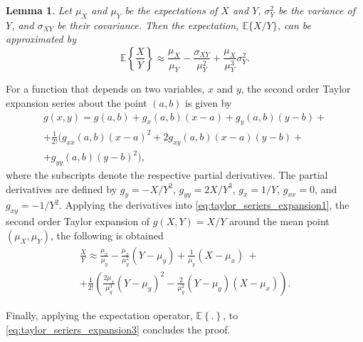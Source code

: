 \documentclass[journal,12pt,onecolumn]{IEEEtran}
\newtheorem{lemma}{Lemma}
\begin{document}
\begin{lemma} Let $\mu_X$ and $\mu_Y$ be the expectations of $X$ and $Y$, $\sigma_{Y}^{2}$ be the variance of $Y$, and $\sigma_{XY}$ be their covariance. Then the expectation, $\mathbb{E} \{X/Y \}$, can be approximated by
\begin{equation}\label{eq:taylor_seriers_expansion}
\mathbb{E} \left\lbrace \frac{X}{Y} \right\rbrace \approx \frac{ \mu_{X} }{ \mu_{Y} } - \frac{\sigma_{XY}}{\mu_{Y}^{2}} + \frac{\mu_{X}}{\mu_{Y}^{3}} \sigma_{Y}^{2}.
\end{equation}
\end{lemma}
\begin{IEEEproof} For a function that depends on two variables, $x$ and $y$, the second order Taylor expansion series about the point $(a,b)$ is given by
\begin{equation}\label{eq:taylor_seriers_expansion1}
\begin{split}
g(x,y) = g(a,b)+g_{x}(a,b)(x-a) + g_{y}(a,b)(y-b) + \\ +\frac{1}{2!} ( g_{xx}(a,b)(x-a)^2 + 2g_{xy}(a,b)(x-a)(y-b) + \\ + g_{yy}(a,b)(y-b)^{2} ),
\end{split}
\end{equation}
where the subscripts denote the respective partial derivatives. The partial derivatives are defined by $g_{y} = -X/Y^2$, $g_{yy} = 2X/Y^3$, $g_{x} = 1/Y$, $g_{xx} = 0$, and $g_{xy} = - 1/Y^2$. Applying the derivatives into \eqref{eq:taylor_seriers_expansion1}, the second order Taylor expansion of $g(X,Y) = X/Y$ around the mean point $(\mu_{X}, \mu_{Y})$, the following is obtained
\begin{equation}\label{eq:taylor_seriers_expansion3}
\begin{split}
\frac{X}{Y} \approx \frac{\mu_{x}}{\mu_{y}} - \frac{\mu_{x}}{\mu_{y}^2}(Y - \mu_{y}) + \frac{1}{\mu_{y}}(X - \mu_{x}) \ + \\ +\frac{1}{2!} \left( \frac{2\mu_{x}}{\mu_{y}^3}(Y - \mu_{y})^2 - \frac{2}{\mu_{y}^2}(Y - \mu_{y})(X - \mu_{x}) \right).
\end{split}
\end{equation}

Finally, applying the expectation operator, $\mathbb{E} \left\lbrace .\right\rbrace$, to \eqref{eq:taylor_seriers_expansion3} concludes the proof.
\end{IEEEproof}
\end{document}
